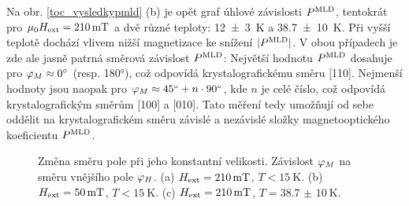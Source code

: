 Na obr. \ref{toc_vysledkypmld} (b) je opět graf úhlové závislosti $P^{\text{MLD}}$, tentokrát pro $\mu_0H_\text{ext}=\SI{210}{\milli\tesla}$ a dvě různé teploty: \SI{12(3)}{\kelvin} a \SI{38,7(10)}{\kelvin}. Při vyšší teplotě dochází vlivem nižší magnetizace ke snížení $|P^{\text{MLD}}|$. V obou případech je zde ale jasně patrná směrová závislost $P^{\text{MLD}}$: Největší hodnotu $P^{\text{MLD}}$ dosahuje pro $\varphi_M\approx \ang{0}$ (resp. \ang{180}), což odpovídá krystalografickému směru [110]. Nejmenší hodnoty jsou naopak pro $\varphi_M\approx \ang{45}+n\cdot \ang{90}$, kde $n$ je celé číslo, což odpovídá krystalografickým směrům [100] a [010]. Tato měření tedy umožňují od sebe oddělit na krystalografickém směru závislé a nezávislé složky magnetooptického koeficientu $P^{\text{MLD}}$.

\begin{figure}[htbp]\centering
{}
	\caption{Změna směru pole při jeho konstantní velikosti. Závislost $\varphi_M$ na směru vnějšího pole $\varphi_H$. (a) $H_\text{ext}=\SI{210}{\milli\tesla}$, $T<\SI{15}{\kelvin}$. (b) $H_\text{ext}=\SI{50}{\milli\tesla}$, $T<\SI{15}{\kelvin}$. (c)  $H_\text{ext}=\SI{210}{\milli\tesla}$, $T=\SI{38,7(10)}{\kelvin}$. }\label{toc_vysledkyuhel}
\end{figure}

